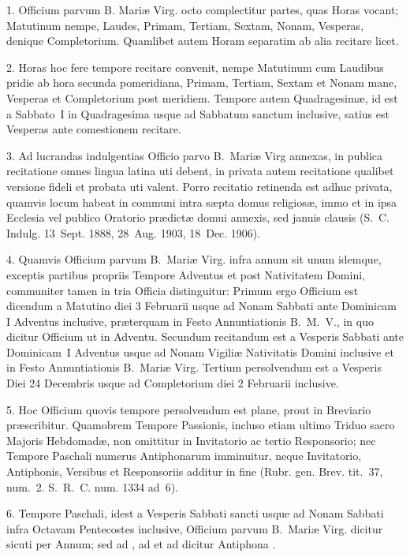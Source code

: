 
\begin{multicols}{2}

1. Officium parvum B. Mariæ Virg. octo complectitur partes, quas Horas vocant;
Matutinum nempe, Laudes, Primam, Tertiam, Sextam, Nonam, Vesperas, denique
Completorium. Quamlibet autem Horam separatim ab alia recitare licet.

2. Horas hoc fere tempore recitare convenit, nempe Matutinum cum Laudibus 
pridie ab hora secunda pomeridiana, Primam, Tertiam, Sextam et Nonam mane,
Vesperas et Completorium post meridiem.
Tempore autem Quadragesimæ, id est a Sabbato~I in Quadragesima usque ad
Sabbatum sanctum inclusive, satius est Vesperas ante comestionem recitare.

3. Ad lucrandas indulgentias Officio parvo B.~Mariæ Virg annexas, in publica
recitatione omnes lingua latina uti debent, in privata autem recitatione
qualibet versione fideli et probata uti valent.
Porro recitatio retinenda est adhuc privata, quamvis locum habeat in communi
intra sæpta domus religiosæ, immo et in ipsa Ecclesia vel publico Oratorio
prædictæ domui annexis, sed januis clausis (S.~C. Indulg. 13~Sept. 1888,
28~Aug. 1903, 18~Dec. 1906).

4. Quamvis Officium parvum B.~Mariæ Virg. infra annum sit unum idemque,
exceptis partibus propriis Tempore Adventus et post Nativitatem Domini,
communiter tamen in tria Officia distinguitur:
Primum ergo Officium est dicendum a Matutino diei 3 Februarii usque ad Nonam
Sabbati ante Dominicam I Adventus inclusive, præterquam in Festo Annuntiationis
B.~M.~V., in quo dicitur Officium ut in Adventu.
Secundum recitandum est a Vesperis Sabbati ante Dominicam~I Adventus usque ad
Nonam Vigiliæ Nativitatis Domini inclusive et in Festo Annuntiationis
B.~Mariæ Virg.
Tertium persolvendum est a Vesperis Diei 24 Decembris usque ad Completorium
diei 2 Februarii inclusive.

5. Hoc Officium quovis tempore persolvendum est plane, prout in Breviario
præscribitur. Quamobrem Tempore Passionis, incluso etiam ultimo Triduo 
sacro Majoris Hebdomadæ, non omittitur  in Invitatorio
ac tertio Responsorio; nec Tempore Paschali numerus Antiphonarum imminuitur,
neque Invitatorio, Antiphonis, Versibus et Responsoriis additur in fine
 (Rubr. gen. Brev. tit.~37, num.~2. S.~R.~C. num. 1334 ad~6).

6. Tempore Paschali, idest a Vesperis Sabbati sancti usque ad Nonam Sabbati
infra Octavam Pentecostes inclusive, Officium parvum B.~Mariæ Virg.
dicitur sicuti per Annum; sed ad , ad 
et ad  dicitur Antiphona .


\end{multicols}
